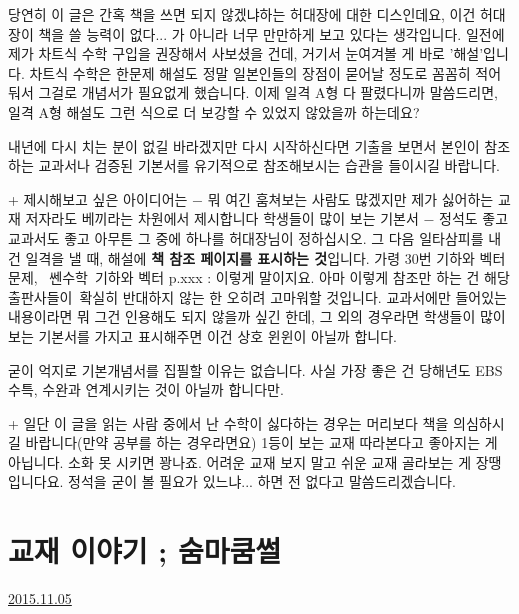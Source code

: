 당연히 이 글은 간혹 책을 쓰면 되지 않겠냐하는 허대장에 대한 디스인데요,
이건 허대장이 책을 쓸 능력이 없다... 가 아니라 너무 만만하게 보고 있다는 생각입니다.
일전에 제가 차트식 수학 구입을 권장해서 사보셨을 건데, 거기서 눈여겨볼 게 바로 '해설'입니다.
차트식 수학은 한문제 해설도 정말 일본인들의 장점이 묻어날 정도로 꼼꼼히 적어둬서 그걸로 개념서가 필요없게 했습니다.
이제 일격 A형 다 팔렸다니까 말씀드리면, 일격 A형 해설도 그런 식으로 더 보강할 수 있었지 않았을까 하는데요?
\vspace{5mm}

내년에 다시 치는 분이 없길 바라겠지만 다시 시작하신다면
기출을 보면서 본인이 참조하는 교과서나 검증된 기본서를 유기적으로 참조해보시는 습관을 들이시길 바랍니다.
\vspace{5mm}

+ 제시해보고 싶은 아이디어는 $-$ 뭐 여긴 훔쳐보는 사람도 많겠지만 제가 싫어하는 교재 저자라도 베끼라는 차원에서 제시합니다
학생들이 많이 보는 기본서 $-$ 정석도 좋고 교과서도 좋고 아무튼 그 중에 하나를 허대장님이 정하십시오.
그 다음 일타삼피를 내건 일격을 낼 때, 해설에 \textbf{책 참조 페이지를 표시하는 것}입니다.
가령 30번 기하와 벡터 문제,  쎈수학 기하와 벡터 p.xxx : 이렇게 말이지요.
아마 이렇게 참조만 하는 건 해당 출판사들이 확실히 반대하지 않는 한 오히려 고마워할 것입니다.
교과서에만 들어있는 내용이라면 뭐 그건 인용해도 되지 않을까 싶긴 한데, 그 외의 경우라면
학생들이 많이 보는 기본서를 가지고 표시해주면 이건 상호 윈윈이 아닐까 합니다.
\vspace{5mm}

굳이 억지로 기본개념서를 집필할 이유는 없습니다.
사실 가장 좋은 건 당해년도 EBS 수특, 수완과 연계시키는 것이 아닐까 합니다만.
\vspace{5mm}

+ 일단 이 글을 읽는 사람 중에서 난 수학이 싫다하는 경우는 머리보다 책을 의심하시길 바랍니다(만약 공부를 하는 경우라면요)
1등이 보는 교재 따라본다고 좋아지는 게 아닙니다. 소화 못 시키면 꽝나죠.
어려운 교재 보지 말고 쉬운 교재 골라보는 게 장땡입니다요. 정석을 굳이 볼 필요가 있느냐... 하면 전 없다고 말씀드리겠습니다.
\vspace{5mm}






\section{교재 이야기 ; 숨마쿰썰}
\href{https://www.kockoc.com/Apoc/464449}{2015.11.05}

\vspace{5mm}

